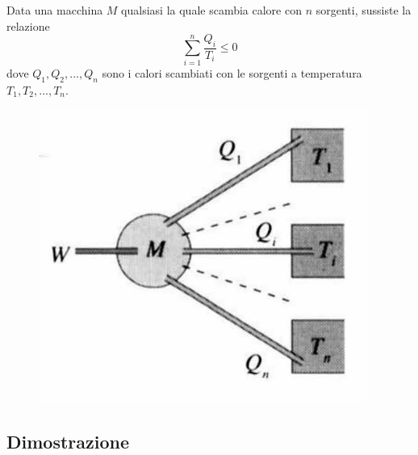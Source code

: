 \documentclass[class=book, crop=false, oneside, 12pt]{standalone}
\begin{document}
Data una macchina \(M\) qualsiasi la quale scambia calore con \(n\) sorgenti, sussiste la relazione 
\begin{equation} \label{enunciato_teorema_clausius}
    \sum_{i = 1}^{n} \frac{Q_i}{T_i} \leq 0
\end{equation}
dove \(Q_1, Q_2, ... , Q_n\) sono i calori scambiati con le sorgenti a temperatura \(T_1, T_2, ... , T_n.\)
\begin{figure}[h]
    \includegraphics[scale=0.4]{clausius_enunciato.png}
    \centering
    \caption{}
\end{figure}

\subsection{Dimostrazione}
\end{document}
